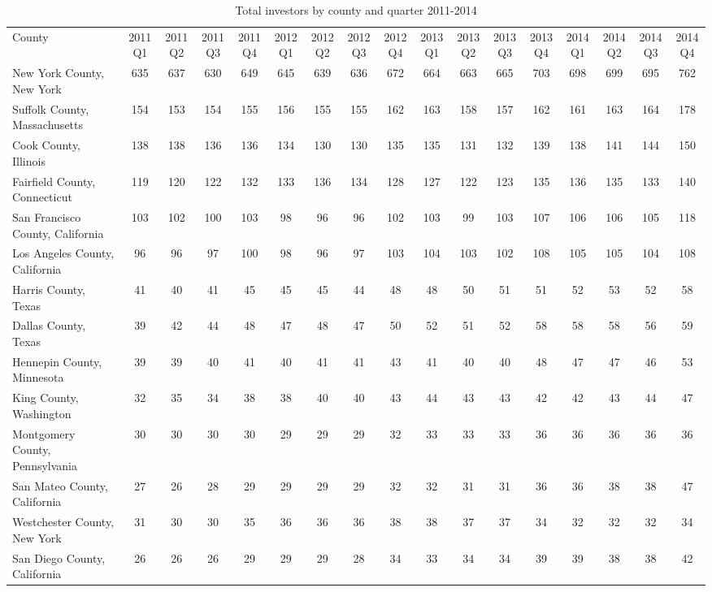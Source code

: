 \begin{landscape}
\begin{longtable}{lcccccccccccccccc}
				\caption[Total Investors by County and Quarter 2011-2014]{Total investors by county and quarter 2011-2014}\\
	County &2011Q1 &2011Q2 &2011Q3 &2011Q4 &2012Q1 &2012Q2 &2012Q3 &2012Q4 &2013Q1 & 2013Q2 &2013Q3 &2013Q4 &2014Q1 &2014Q2 &2014Q3 & 2014Q4 \\
	New York County, New York & 635 & 637 & 630 & 649 & 645 & 639 & 636 & 672 & 664 & 663 & 665 & 703 & 698 & 699 & 695 & 762 \\
	Suffolk County, Massachusetts & 154 & 153 & 154 & 155 & 156 & 155 & 155 & 162 & 163 & 158 & 157 & 162 & 161 & 163 & 164 & 178 \\
	Cook County, Illinois & 138 & 138 & 136 & 136 & 134 & 130 & 130 & 135 & 135 & 131 & 132 & 139 & 138 & 141 & 144 & 150 \\
	Fairfield County, Connecticut & 119 & 120 & 122 & 132 & 133 & 136 & 134 & 128 & 127 & 122 & 123 & 135 & 136 & 135 & 133 & 140 \\
	San Francisco County, California & 103 & 102 & 100 & 103 & 98 & 96 & 96 & 102 & 103 & 99 & 103 & 107 & 106 & 106 & 105 & 118 \\
	Los Angeles County, California & 96 & 96 & 97 & 100 & 98 & 96 & 97 & 103 & 104 & 103 & 102 & 108 & 105 & 105 & 104 & 108 \\
	Harris County, Texas & 41 & 40 & 41 & 45 & 45 & 45 & 44 & 48 & 48 & 50 & 51 & 51 & 52 & 53 & 52 & 58 \\
	Dallas County, Texas & 39 & 42 & 44 & 48 & 47 & 48 & 47 & 50 & 52 & 51 & 52 & 58 & 58 & 58 & 56 & 59 \\
	Hennepin County, Minnesota & 39 & 39 & 40 & 41 & 40 & 41 & 41 & 43 & 41 & 40 & 40 & 48 & 47 & 47 & 46 & 53 \\
	King County, Washington & 32 & 35 & 34 & 38 & 38 & 40 & 40 & 43 & 44 & 43 & 43 & 42 & 42 & 43 & 44 & 47 \\
	Montgomery County, Pennsylvania & 30 & 30 & 30 & 30 & 29 & 29 & 29 & 32 & 33 & 33 & 33 & 36 & 36 & 36 & 36 & 36 \\
	San Mateo County, California & 27 & 26 & 28 & 29 & 29 & 29 & 29 & 32 & 32 & 31 & 31 & 36 & 36 & 38 & 38 & 47 \\
	Westchester County, New York & 31 & 30 & 30 & 35 & 36 & 36 & 36 & 38 & 38 & 37 & 37 & 34 & 32 & 32 & 32 & 34 \\
	San Diego County, California & 26 & 26 & 26 & 29 & 29 & 29 & 28 & 34 & 33 & 34 & 34 & 39 & 39 & 38 & 38 & 42 \\

\end{longtable}
\end{landscape}
